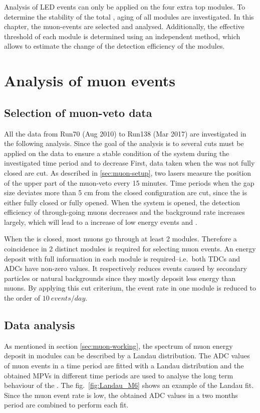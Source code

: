 Analysis of LED events can only be applied on the four extra top modules. To determine the stability of the total \mvs, aging of all modules are investigated. In this chapter, the muon-events are selected and analysed. Additionally, the effective threshold of each module is determined using an independent method, which allows to estimate the change of the detection efficiency of the modules.

\section{Analysis of muon events}

\subsection{Selection of muon-veto data}
All the data from Run70 (Aug 2010) to Run138 (Mar 2017) are investigated in the following analysis. Since the goal of the analysis is to  several cuts must be applied on the data to ensure a stable condition of the system during the investigated time period and to decrease
First, data taken when the \mvs{} was not fully closed are cut. As described in \ref{sec:muon-setup}, two lasers measure the position of the upper part of the muon-veto every 15 minutes. Time periods when the gap size deviates more than 5 cm from the closed configuration are cut, since the \mvs{} is either fully closed or fully opened. When the system is opened, the detection efficiency of through-going muons decreases and the background rate increases largely, which will lead to a increase of low energy events and .

When the \mvs{} is closed, most muons go through at least 2 modules. Therefore a coincidence in 2 distinct modules is required for selecting muon events. An energy deposit with full information in each module is required--i.e.\ both TDCs and ADCs have non-zero values. It respectively reduces events caused by secondary particles or natural backgrounds since they mostly deposit less energy than muons. By applying this cut criterium, the event rate in one module is reduced to the order of $\SI{10}{events/day}$.

\subsection{Data analysis}
As mentioned in section \ref{sec:muon-working}, the spectrum of muon energy deposit in modules can be described by a Landau distribution. The ADC values of muon events in a time period are fitted with a Landau distribution and the obtained MPVs in different time periods are used to analyse the long term behaviour of the \mvs. The fig.\ \ref{fig:Landau_M6} shows an example of the Landau fit. Since the muon event rate is low, the obtained ADC values in a two months period are combined to perform each fit.

